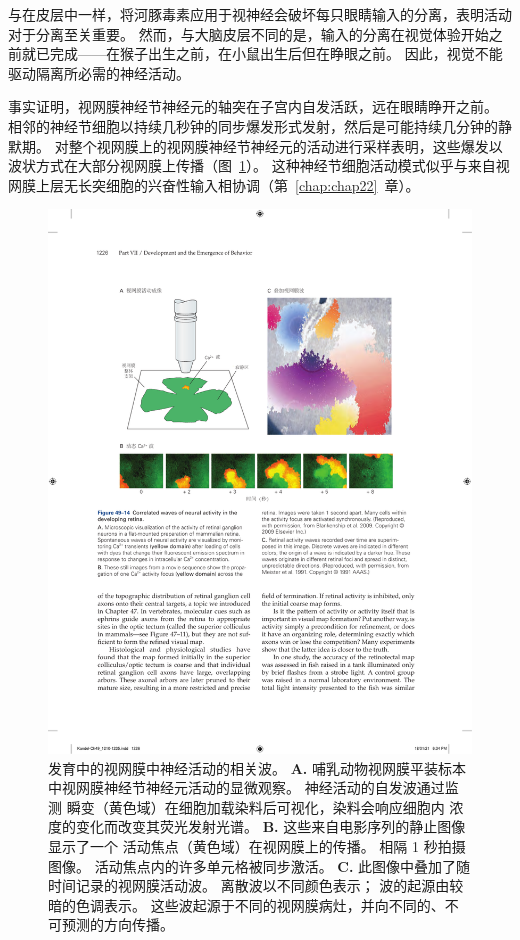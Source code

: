 与在皮层中一样，将河豚毒素应用于视神经会破坏每只眼睛输入的分离，表明活动对于分离至关重要。
然而，与大脑皮层不同的是，输入的分离在视觉体验开始之前就已完成——在猴子出生之前，在小鼠出生后但在睁眼之前。
因此，视觉不能驱动隔离所必需的神经活动。


事实证明，视网膜神经节神经元的轴突在子宫内自发活跃，远在眼睛睁开之前。
相邻的神经节细胞以持续几秒钟的同步爆发形式发射，然后是可能持续几分钟的静默期。
对整个视网膜上的视网膜神经节神经元的活动进行采样表明，这些爆发以波状方式在大部分视网膜上传播（图~\ref{fig:49_14}）。
这种神经节细胞活动模式似乎与来自视网膜上层无长突细胞的兴奋性输入相协调（第~\ref{chap:chap22}~章）。


\begin{figure}[htbp]
	\centering
	\includegraphics[width=0.8\linewidth]{chap49/fig_49_14}
	\caption{发育中的视网膜中神经活动的相关波。
		\textbf{A.} 哺乳动物视网膜平装标本中视网膜神经节神经元活动的显微观察。
		神经活动的自发波通过监测  瞬变（黄色域）在细胞加载染料后可视化，染料会响应细胞内  浓度的变化而改变其荧光发射光谱。
		\textbf{B.} 这些来自电影序列的静止图像显示了一个  活动焦点（黄色域）在视网膜上的传播。
		相隔 1 秒拍摄图像。
		活动焦点内的许多单元格被同步激活。
		\textbf{C.} 此图像中叠加了随时间记录的视网膜活动波。
		离散波以不同颜色表示；
		波的起源由较暗的色调表示。
		这些波起源于不同的视网膜病灶，并向不同的、不可预测的方向传播。}
	\label{fig:49_14}
\end{figure}



